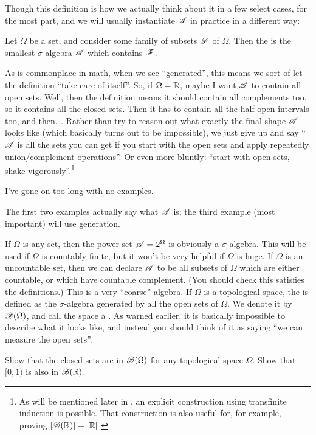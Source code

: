 Though this definition is how we actually think about it in a few select cases,
for the most part, and we will usually instantiate $\mathscr A$ in practice
in a different way:
\begin{definition}
	Let $\Omega$ be a set, and consider some family of subsets $\mathscr F$ of $\Omega$.
	Then the 
	is the smallest $\sigma$-algebra $\mathscr A$ which contains $\mathscr F$.
\end{definition}
As is commonplace in math, when we see ``generated'',
this means we sort of let the definition ``take care of itself''.
So, if $\Omega = \mathbb R$, maybe I want $\mathscr A$ to contain all open sets.
Well, then the definition means it should contain all complements too,
so it contains all the closed sets.
Then it has to contain all the half-open intervals too, and then\dots.
Rather than try to reason out what exactly the final shape $\mathscr A$ looks like
(which basically turns out to be impossible),
we just give up and say ``$\mathscr A$ is all the sets you can get if you start
with the open sets and apply repeatedly union/complement operations''.
Or even more bluntly: ``start with open sets, shake vigorously''.\footnote{
	As will be mentioned later in ,
	an explicit construction using transfinite induction is possible.
	That construction is also useful for, for example, proving $|\mathscr B(\mathbb R)| = |\mathbb R|$.}

I've gone on too long with no examples.
\begin{example}
	The first two examples actually say what $\mathscr A$ is;
	the third example (most important) will use generation.
	\begin{enumerate}[(a)]
		\ii If $\Omega$ is any set,
		then the power set $\mathscr A = 2^{\Omega}$ is obviously a $\sigma$-algebra.
		This will be used if $\Omega$ is countably finite,
		but it won't be very helpful if $\Omega$ is huge.
		\ii If $\Omega$ is an uncountable set,
		then we can declare $\mathscr A$ to be all subsets of $\Omega$
		which are either countable,
		or which have countable complement.
		(You should check this satisfies the definitions.)
		This is a very ``coarse'' algebra.
		\ii If $\Omega$ is a topological space,
		the 
		is defined as the $\sigma$-algebra generated by all the open sets of $\Omega$.
		We denote it by $\mathscr B(\Omega)$,
		and call the space a .
		As warned earlier, it is basically impossible to describe
		what it looks like,
		and instead you should think of it as saying
		``we can measure the open sets''.
	\end{enumerate}
\end{example}
\begin{ques}
	Show that the closed sets are in $\mathscr B(\Omega)$ for
	any topological space $\Omega$.
	Show that $[0,1)$ %
	is also in $\mathscr B(\mathbb R)$.
\end{ques}

